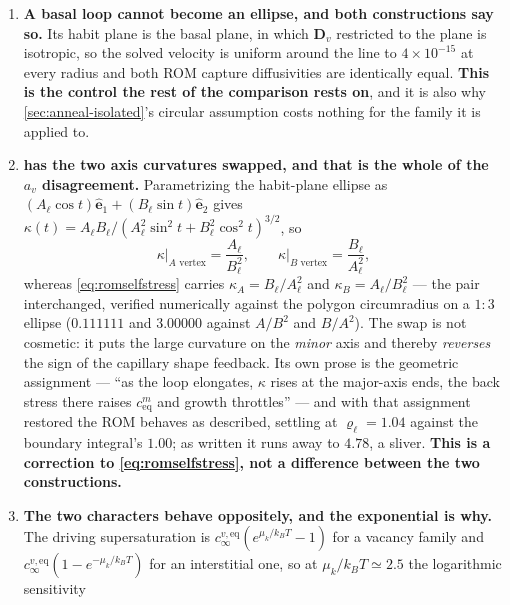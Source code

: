 \documentclass{article}
\newcommand{\Dten}{\bm D}
\begin{document}
\begin{enumerate}
\item \textbf{A basal loop cannot become an ellipse, and both constructions say
      so.} Its habit plane is the basal plane, in which $\Dten_v$ restricted to
      the plane is isotropic, so the solved velocity is uniform around the line to
      $4\times10^{-15}$ at every radius and both ROM capture diffusivities are
      identically equal. \textbf{This is the control the rest of the comparison
      rests on}, and it is also why \cref{sec:anneal-isolated}'s circular
      assumption costs nothing for the family it is applied to.
\item \textbf{ has the two axis curvatures swapped, and
      that is the whole of the $a_v$ disagreement.} Parametrizing the habit-plane
      ellipse as $(A_\ell\cos t)\hat{\bm e}_1+(B_\ell\sin t)\hat{\bm e}_2$ gives
      $\kappa(t)=A_\ell B_\ell/(A_\ell^2\sin^2t+B_\ell^2\cos^2t)^{3/2}$, so
      \begin{equation}
        \kappa\bigl|_{A\text{ vertex}}=\frac{A_\ell}{B_\ell^{2}},
        \qquad
        \kappa\bigl|_{B\text{ vertex}}=\frac{B_\ell}{A_\ell^{2}},
        \label{eq:kappavertex}
      \end{equation}
      whereas \cref{eq:romselfstress} carries $\kappa_A=B_\ell/A_\ell^2$ and
      $\kappa_B=A_\ell/B_\ell^2$ --- the pair interchanged, verified numerically
      against the polygon circumradius on a $1{:}3$ ellipse ($0.111111$ and
      $3.00000$ against $A/B^2$ and $B/A^2$). The swap is not cosmetic: it puts
      the large curvature on the \emph{minor} axis and thereby \emph{reverses} the
      sign of the capillary shape feedback. Its own prose is the geometric
      assignment --- ``as the loop elongates, $\kappa$ rises at the major-axis
      ends, the back stress there raises $c^m_{\mathrm{eq}}$ and growth
      throttles'' --- and with that assignment restored the ROM behaves as
      described, settling at $\varrho_\ell=1.04$ against the boundary integral's
      $1.00$; as written it runs away to $4.78$, a sliver. \textbf{This is a
      correction to \cref{eq:romselfstress}, not a difference between the two
      constructions.}
\item \textbf{The two characters behave oppositely, and the exponential is why.}
      The driving supersaturation is $c^{v,\mathrm{eq}}_\infty(e^{\mu_k/k_BT}-1)$
      for a vacancy family and $c^{v,\mathrm{eq}}_\infty(1-e^{-\mu_k/k_BT})$ for
      an interstitial one, so at $\mu_k/k_BT\simeq2.5$ the logarithmic sensitivity

\end{enumerate}
\end{document}
